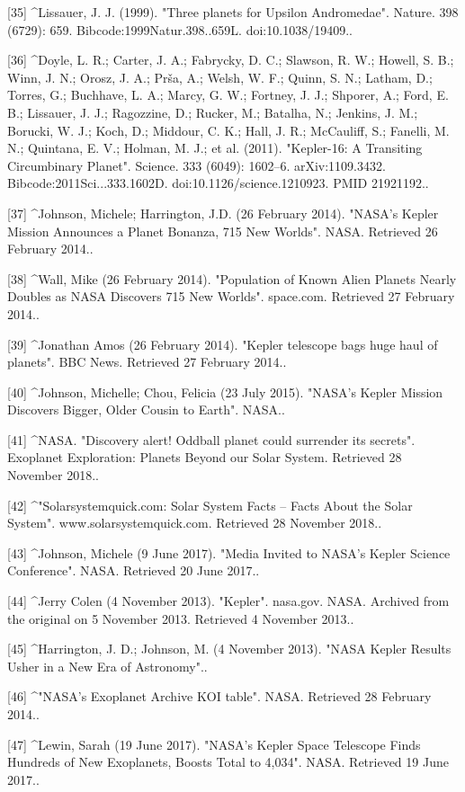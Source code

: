 [35]
^Lissauer, J. J. (1999). "Three planets for Upsilon Andromedae". Nature. 398 (6729): 659. Bibcode:1999Natur.398..659L. doi:10.1038/19409..

[36]
^Doyle, L. R.; Carter, J. A.; Fabrycky, D. C.; Slawson, R. W.; Howell, S. B.; Winn, J. N.; Orosz, J. A.; Prša, A.; Welsh, W. F.; Quinn, S. N.; Latham, D.; Torres, G.; Buchhave, L. A.; Marcy, G. W.; Fortney, J. J.; Shporer, A.; Ford, E. B.; Lissauer, J. J.; Ragozzine, D.; Rucker, M.; Batalha, N.; Jenkins, J. M.; Borucki, W. J.; Koch, D.; Middour, C. K.; Hall, J. R.; McCauliff, S.; Fanelli, M. N.; Quintana, E. V.; Holman, M. J.; et al. (2011). "Kepler-16: A Transiting Circumbinary Planet". Science. 333 (6049): 1602–6. arXiv:1109.3432. Bibcode:2011Sci...333.1602D. doi:10.1126/science.1210923. PMID 21921192..

[37]
^Johnson, Michele; Harrington, J.D. (26 February 2014). "NASA's Kepler Mission Announces a Planet Bonanza, 715 New Worlds". NASA. Retrieved 26 February 2014..

[38]
^Wall, Mike (26 February 2014). "Population of Known Alien Planets Nearly Doubles as NASA Discovers 715 New Worlds". space.com. Retrieved 27 February 2014..

[39]
^Jonathan Amos (26 February 2014). "Kepler telescope bags huge haul of planets". BBC News. Retrieved 27 February 2014..

[40]
^Johnson, Michelle; Chou, Felicia (23 July 2015). "NASA's Kepler Mission Discovers Bigger, Older Cousin to Earth". NASA..

[41]
^NASA. "Discovery alert! Oddball planet could surrender its secrets". Exoplanet Exploration: Planets Beyond our Solar System. Retrieved 28 November 2018..

[42]
^"Solarsystemquick.com: Solar System Facts – Facts About the Solar System". www.solarsystemquick.com. Retrieved 28 November 2018..

[43]
^Johnson, Michele (9 June 2017). "Media Invited to NASA's Kepler Science Conference". NASA. Retrieved 20 June 2017..

[44]
^Jerry Colen (4 November 2013). "Kepler". nasa.gov. NASA. Archived from the original on 5 November 2013. Retrieved 4 November 2013..

[45]
^Harrington, J. D.; Johnson, M. (4 November 2013). "NASA Kepler Results Usher in a New Era of Astronomy"..

[46]
^"NASA's Exoplanet Archive KOI table". NASA. Retrieved 28 February 2014..

[47]
^Lewin, Sarah (19 June 2017). "NASA's Kepler Space Telescope Finds Hundreds of New Exoplanets, Boosts Total to 4,034". NASA. Retrieved 19 June 2017..

